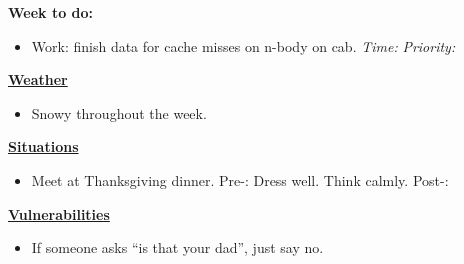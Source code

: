 \documentclass[11pt]{article}
\newcommand{\timeEst}[1]{\textit{Time:} \textit{#1}}
\newcommand{\priority}[1]{\textit{Priority:} \textit{#1}}
\newcommand{\deadline}[1]{#1}
\newcommand{\comments}[1]{}
\begin{document}
{\newpage


\textbf{Week to do:} 
\begin{itemize} 
  \tiny \item \tiny Work: finish data for cache misses on n-body on cab. \deadline{ }  \timeEst{}  \priority{}
\end{itemize} 


\newpage 

\textbf{\small \underline{Weather}} 
\begin{itemize}
\item \tiny Snowy throughout the week.  
\end{itemize} 

\textbf{\small \underline{Situations}} \\
\begin{itemize}
\item \tiny Meet at Thanksgiving dinner.  Pre-: Dress well. Think calmly.  Post-: 
\end{itemize} 

\textbf{\small \underline{Vulnerabilities}} \\
\begin{itemize}
\item \tiny  If someone asks ``is that your dad'', just say no.
\end{itemize} 

\newpage 


\comments{
\noindent\begin{minipage}{\textwidth}
\begin{minipage}[c][6cm][c]{\dimexpr0.5\textwidth-0.5\Colsep\relax}
\lipsum[4]
\end{minipage}\hfill
\begin{minipage}[c][6cm][c]{\dimexpr0.5\textwidth-0.5\Colsep\relax}
\lipsum[4]
\end{minipage}%
\end{minipage}
\lipsum[4]
}

}
\end{document}
